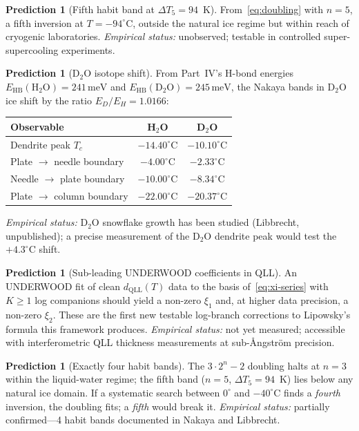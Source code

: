 \documentclass[11pt,letterpaper]{article}
\theoremstyle{plain}
\theoremstyle{definition}
\newtheorem{prediction}[theorem]{Prediction}
\begin{document}
\begin{prediction}[Fifth habit band at $\Delta T_5 = 94$~K]
\label{pred:P2}
From~\eqref{eq:doubling} with $n=5$, a fifth inversion at
$T = -94^\circ$C, outside the natural ice regime but within
reach of cryogenic laboratories.
\emph{Empirical status:} unobserved; testable in controlled
super-supercooling experiments.
\end{prediction}

\begin{prediction}[D$_2$O isotope shift]\label{pred:D2O}
From Part~IV's H-bond energies $E_{\text{HB}}(\text{H}_2\text{O})
= 241\,\text{meV}$ and $E_{\text{HB}}(\text{D}_2\text{O})=245\,\text{meV}$,
the Nakaya bands in D$_2$O ice shift by the ratio
$E_D/E_H = 1.0166$:
\begin{center}
\begin{tabular}{@{}lcc@{}}
\toprule
Observable & H$_2$O & D$_2$O \\
\midrule
Dendrite peak $T_c$ & $-14.40^\circ$C & $-10.10^\circ$C \\
Plate $\to$ needle boundary & $-4.00^\circ$C & $-2.33^\circ$C \\
Needle $\to$ plate boundary & $-10.00^\circ$C & $-8.34^\circ$C \\
Plate $\to$ column boundary & $-22.00^\circ$C & $-20.37^\circ$C \\
\bottomrule
\end{tabular}
\end{center}
\emph{Empirical status:} D$_2$O snowflake growth has been studied
(Libbrecht, unpublished); a precise measurement of the D$_2$O
dendrite peak would test the $+4.3^\circ$C shift.
\end{prediction}

\begin{prediction}[Sub-leading UNDERWOOD coefficients in QLL]
\label{pred:UW}
An UNDERWOOD fit of clean $d_{\text{QLL}}(T)$ data to the basis
of~\eqref{eq:xi-series} with $K \ge 1$ log companions should yield
a non-zero $\xi_1$ and, at higher data precision, a non-zero
$\xi_2$.  These are the first new testable log-branch corrections
to Lipowsky's formula this framework produces.
\emph{Empirical status:} not yet measured; accessible with
interferometric QLL thickness measurements at sub-\AA ngstr\"{o}m
precision.
\end{prediction}

\begin{prediction}[Exactly four habit bands]\label{pred:P5}
The $3\cdot 2^n - 2$ doubling halts at $n = 3$ within the
liquid-water regime; the fifth band ($n = 5$, $\Delta T_5 = 94$~K)
lies below any natural ice domain.  If a systematic search between
$0^\circ$ and $-40^\circ$C finds a \emph{fourth} inversion, the
doubling fits; a \emph{fifth} would break it.
\emph{Empirical status:} partially confirmed---4 habit bands
documented in Nakaya and Libbrecht.
\end{prediction}
\end{document}
